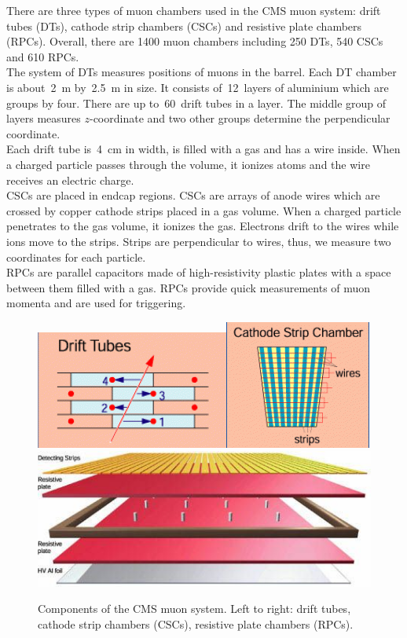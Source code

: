 There are three types of muon chambers used in the CMS muon system: drift tubes (DTs), cathode strip chambers (CSCs) and resistive plate chambers (RPCs). Overall, there are 1400 muon chambers including 250 DTs, 540 CSCs and 610 RPCs.\\

The system of DTs measures positions of muons in the barrel. Each DT chamber is about~2~m by~2.5~m in size. It consists of~12~layers of aluminium which are groups by four. There are up to~60~drift tubes in a layer. The middle group of layers measures $z$-coordinate and two other groups determine the perpendicular coordinate.\\

Each drift tube is~4~cm in width, is filled with a gas and has a wire inside. When a charged particle passes through the volume, it ionizes atoms and the wire receives an electric charge.\\

CSCs are placed in endcap regions. CSCs are arrays of anode wires which are crossed by copper cathode strips placed in a gas volume. When a charged particle penetrates to the gas volume, it ionizes the gas. Electrons drift to the wires while ions move to the strips. Strips are perpendicular to wires, thus, we measure two coordinates for each particle. \\ 

RPCs are parallel capacitors made of high-resistivity plastic plates with a space between them filled with a gas. RPCs provide quick measurements of muon momenta and are used for triggering. \\ 

\begin{figure}[htb]
  \begin{center}
    \includegraphics[height=2.5 cm]{../figs/Exp/muonSystem_driftTubes.png}\quad\includegraphics[height=2.5 cm]{../figs/Exp/muonSystem_CSC.png}\quad\includegraphics[height=2.5 cm]{../figs/Exp/muonSystem_RPC.png}
    \caption{Components of the CMS muon system. Left to right: drift tubes, cathode strip chambers (CSCs), resistive plate chambers (RPCs).}
    \label{fig:muonSystem}
  \end{center}
\end{figure}


